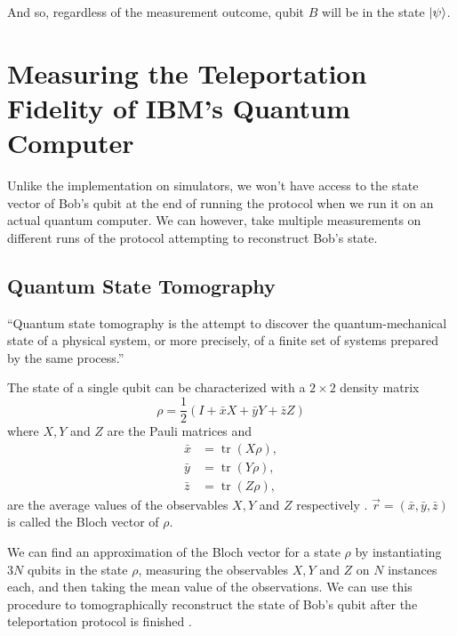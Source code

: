 \documentclass[prx,twocolumn]{revtex4-2}
\numberwithin{equation}{section}
\numberwithin{figure}{section}
\numberwithin{table}{section}
\DeclareMathOperator{\tr}{tr}
\begin{document}
And so, regardless of the measurement outcome, qubit $B$ will be in the state $\ket\psi$. 

\section{Measuring the Teleportation Fidelity of IBM's Quantum Computer}
Unlike the implementation on simulators, we won't have access to the state vector of Bob's qubit at the end 
of running the protocol when we run it on an actual quantum computer. We can however, take multiple 
measurements on different runs of the protocol attempting to reconstruct Bob's state.
\subsection{Quantum State Tomography}
``Quantum state tomography is the attempt to discover the quantum-mechanical state of a physical system, or
more precisely, of a finite set of systems prepared by the same process.'' \cite{tomography}

The state of a single qubit can be characterized with a $2\times 2$ density matrix
\begin{equation}
    \rho = \frac{1}{2} (I + \bar{x} X + \bar{y} Y + \bar{z} Z)
\end{equation}
where $X, Y$ and $Z$ are the Pauli matrices and 
\begin{equation}
    \begin{aligned}
        \bar{x} &= \tr(X\rho), \\
        \bar{y} &= \tr(Y\rho), \\
        \bar{z} &= \tr(Z\rho),
    \end{aligned}
\end{equation}
are the average values of the observables $X,Y$ and $Z$ respectively \cite{nielsen-chuang}.
$\vec{r} = (\bar{x},\bar{y},\bar{z})$ is called the Bloch vector of $\rho$. 

We can find an approximation of the Bloch vector for a state $\rho$ by instantiating $3N$ qubits in the state 
$\rho$, measuring the observables $X, Y$ and $Z$ on $N$ instances each, and then taking the mean value of the 
observations. We can use this procedure to tomographically reconstruct the state of Bob's qubit after the 
teleportation protocol is finished \cite{tomography}.
\end{document}
